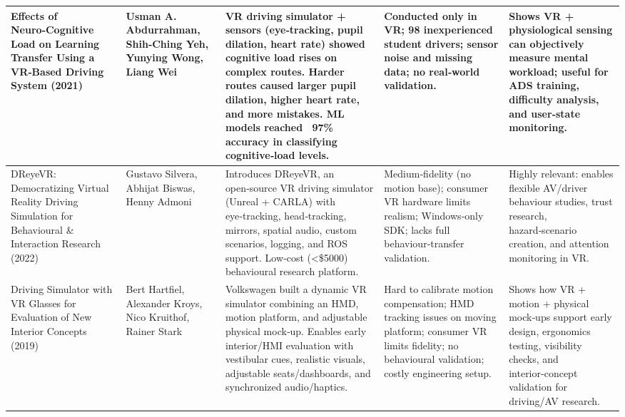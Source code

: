 {\begin{longtable}{|p{}|p{}|>{\raggedright\arraybackslash}p{}|>{\raggedright\arraybackslash}p{}|>{\raggedright\arraybackslash}p{}|}
Effects of Neuro‑Cognitive Load on Learning Transfer Using a VR‑Based Driving System (2021)~\cite{Abdurrahman2021} & Usman A. Abdurrahman, Shih‑Ching Yeh, Yunying Wong, Liang Wei & VR driving simulator + sensors (eye‑tracking, pupil dilation, heart rate) showed cognitive load rises on complex routes. Harder routes caused larger pupil dilation, higher heart rate, and more mistakes. ML models reached ~97\% accuracy in classifying cognitive‑load levels. & Conducted only in VR; 98 inexperienced student drivers; sensor noise and missing data; no real‑world validation. & Shows VR + physiological sensing can objectively measure mental workload; useful for ADS training, difficulty analysis, and user‑state monitoring. \\ \hline
DReyeVR: Democratizing Virtual Reality Driving Simulation for Behavioural \& Interaction Research (2022)~\cite{Silvera2022} & Gustavo Silvera, Abhijat Biswas, Henny Admoni & Introduces DReyeVR, an open‑source VR driving simulator (Unreal + CARLA) with eye‑tracking, head‑tracking, mirrors, spatial audio, custom scenarios, logging, and ROS support. Low‑cost (\textless\$5000) behavioural research platform. & Medium‑fidelity (no motion base); consumer VR hardware limits realism; Windows‑only SDK; lacks full behaviour‑transfer validation. & Highly relevant: enables flexible AV/driver behaviour studies, trust research, hazard‑scenario creation, and attention monitoring in VR. \\ \hline
Driving Simulator with VR Glasses for Evaluation of New Interior Concepts (2019)~\cite{Hartfiel2019} & Bert Hartfiel, Alexander Kroys, Nico Kruithof, Rainer Stark & Volkswagen built a dynamic VR simulator combining an HMD, motion platform, and adjustable physical mock‑up. Enables early interior/HMI evaluation with vestibular cues, realistic visuals, adjustable seats/dashboards, and synchronized audio/haptics. & Hard to calibrate motion compensation; HMD tracking issues on moving platform; consumer VR limits fidelity; no behavioural validation; costly engineering setup. & Shows how VR + motion + physical mock‑ups support early design, ergonomics testing, visibility checks, and interior‑concept validation for driving/AV research. \\ \hline

\end{longtable}}
